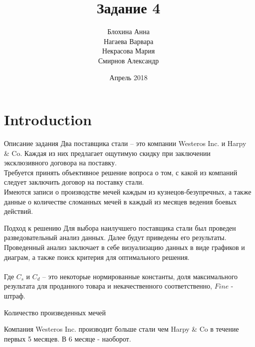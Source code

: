 \documentclass[8pt]{beamer}
\title{Задание 4}
\author{Блохина Анна \\ Нагаева Варвара \\ Некрасова Мария \\ Смирнов Александр}
\date{Апрель 2018}
\begin{document}
\frame{\titlepage}

\section{Introduction}
\begin{frame}{Описание задания}
Два поставщика стали -- это компании {Westeros Inc.} и {Harpy \& Co}. Каждая из них предлагает ощутимую скидку при заключении эксклюзивного договора на поставку.\\
Требуется принять объективное решение вопроса о том, с какой из компаний следует заключить договор на поставку стали.\\
Имеются записи о производстве мечей каждым из кузнецов-безупречных, а также данные о количестве сломанных мечей в каждый из месяцев ведения боевых действий.\\
\end{frame}

\begin{frame}{Подход к решению}
Для выбора наилучшего поставщика стали был проведен разведовательный анализ данных. Далее будут приведены его результаты.\\
Проведенный анализ заключает в себе визуализацию данных в виде графиков и диаграм, а также поиск критерия для оптимального решения.\\
\\
Где $C_s$ и $C_d$ -- это некоторые нормированные константы, доля максимального результата для проданного товара и некачественного соответственно, $Fine$ - штраф.
\end{frame}

\begin{frame}{Количество произведенных мечей}
\begin{figure}[h]
\label{ris:1.png}
\end{figure}
Компания {Westeros Inc.} производит больше стали чем {Harpy \& Co} в течение первых 5 месяцев. В 6 месяце - наоборот.
\end{frame}
\end{document}
